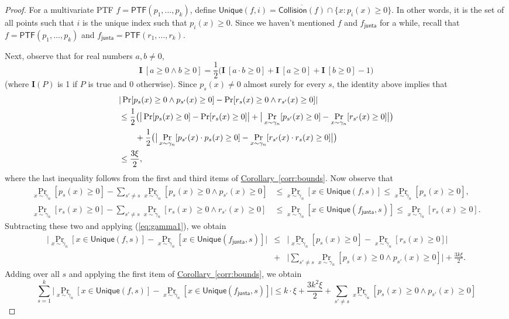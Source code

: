 \documentclass[11pt]{article}
\numberwithin{equation}{section}
\theoremstyle{definition}
\theoremstyle{plain}
\newcommand{\expref}[2]{\hyperref[#2]{#1~\ref{#2}}}
\newcommand{\fh}{{f_{\mathsf{junta}}}}
\begin{document}
\begin{proof}
For
a multivariate PTF $f = \mathsf{PTF}(p_1, \ldots, p_k)$, define
$\mathsf{Unique}(f,i) = \overline{\mathsf{Collision}(f)} \cap \{x : p_i(x)  \ge
0\}$. In other words, it is the set of all points such that $i$ is the unique
index such that $p_i(x) \ge 0$.
Since we haven't mentioned $f$ and $\fh$ for a while, recall that $f =
\mathsf{PTF}(p_1, \dots, p_k)$ and $\fh = \mathsf{PTF}(r_1, \dots, r_k)$.

Next, observe that for real numbers $a, b \ne 0$,
\begin{equation}
  \label{eq:identity}
  \mathbf{I} \ [a \ge 0 \wedge b \ge 0] = \frac12 \big( \mathbf{I} \ [ a \cdot b \ge 0] + \mathbf{I} \ [a \ge 0] + \mathbf{I} \ [b \ge 0] - 1\big)
\end{equation}
(where $\mathbf{I}(P)$ is 1 if $P$ is true and $0$ otherwise).
Since $p_s(x) \ne 0$ almost surely for every $s$, the identity above implies that
\begin{align}
&| \Pr [p_{s}(x) \ge 0 \wedge p_{s'}(x) \ge 0]  - \Pr [r_{s}(x) \ge 0 \wedge r_{s'}(x) \ge 0] | \notag \\
& \le \frac{1}{2} \big( \big| \Pr[p_{s}(x) \ge 0 ]  - \Pr [r_{s}(x) \ge 0 ] \big| +  \big| \Pr_{x \sim \gamma_n} [p_{s'}(x) \ge 0 ]  - \Pr_{x \sim \gamma_n} [r_{s'}(x) \ge 0 ] \big|\big) \notag \\
& \qquad +\frac{1}{2}  \big( \big| \Pr_{x \sim \gamma_n} [p_{s'}(x) \cdot p_s(x) \ge 0 ]  - \Pr_{x \sim \gamma_n} [r_{s'}(x)  \cdot r_s(x)\ge 0 ] \big|\big) \notag \\
&\le \frac{3\xi}{2},
\label{eq:gamma1}
\end{align}
where the last inequality follows from the first and third items of \expref{Corollary}{corr:bounds}. Now observe that 
\begin{align*}
\Pr_{x \sim \gamma_n} [p_s(x) \ge 0] - \sum_{s' \neq s} \Pr_{x \sim \gamma_n} [p_s(x) \ge 0 \wedge p_{s'}(x) \ge 0]  &\leq \Pr_{x \sim \gamma_n} [x \in \mathsf{Unique}(f,s)] \le \Pr_{x \sim \gamma_n} [p_s(x) \ge 0],\\
\Pr_{x \sim \gamma_n} [r_s(x) \ge 0] - \sum_{s' \neq s} \Pr_{x \sim \gamma_n} [r_s(x) \ge 0 \wedge r_{s'}(x) \ge 0]  &\leq \Pr_{x \sim \gamma_n} [x \in \mathsf{Unique}(\fh,s)] \le \Pr_{x \sim \gamma_n} [r_s(x) \ge 0].
\end{align*}
Subtracting these two and applying (\ref{eq:gamma1}), we obtain
\begin{eqnarray*}
\big|\Pr_{x \sim \gamma_n} [x \in \mathsf{Unique}(f,s)]- \Pr_{x \sim \gamma_n} [x \in \mathsf{Unique}(\fh,s)] \big| &\leq& \big| \Pr_{x \sim \gamma_n} [p_s(x) \ge 0] -\Pr_{x \sim \gamma_n} [r_s(x) \ge 0]\big| \\ &+& \big|\sum_{s' \neq s} \Pr_{x \sim \gamma_n} [p_s(x) \ge 0 \wedge p_{s'}(x) \ge 0]\big| + \frac{3k \xi}{2}.
\end{eqnarray*}
Adding over all $s$ and applying the first item of \expref{Corollary}{corr:bounds},  we obtain 
\[
\sum_{s=1}^k \big|\Pr_{x \sim \gamma_n} [x \in \mathsf{Unique}(f,s)]- \Pr_{x \sim \gamma_n} [x \in \mathsf{Unique}(\fh,s)] \big| \le k\cdot \xi + \frac{3k^2 \xi}{2} +\sum_{s' \neq s} \Pr_{x \sim \gamma_n} [p_s(x) \ge 0 \wedge p_{s'}(x) \ge 0]
\]


\end{proof}
\end{document}
